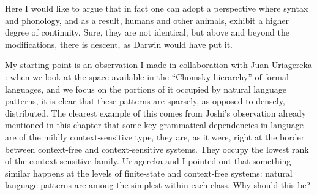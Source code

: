 Here I would like to argue that in fact one can adopt a perspective where syntax and phonology, and as a result, humans and other animals, exhibit a higher degree of continuity. Sure, they are not identical, but above and beyond the modifications, there is descent, as Darwin would have put it.

My starting point is an observation I made in collaboration with Juan Uriagereka \citep{boeckx2011biolinguistics}: when we look at the space available in the ``Chomsky hierarchy'' of formal languages, and we focus on the portions of it occupied by natural language patterns, it is clear that these patterns are sparsely, as opposed to densely, distributed. The clearest example of this comes from Joshi's observation already mentioned in this chapter that some key grammatical dependencies in language are of the mildly context-sensitive type, they are, as it were, right at the border between context-free and context-sensitive systems. They occupy the lowest rank of the context-sensitive family. Uriagereka and I pointed out that something similar happens at the levels of finite-state and context-free systems: natural language patterns are among the simplest within each class. Why should this be?


